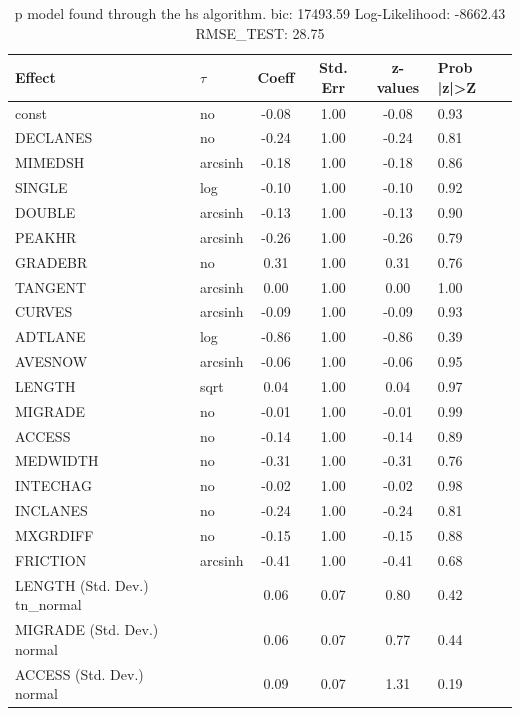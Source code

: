 \begin{table}
	\caption{p model found through the hs algorithm. bic: 17493.59 Log-Likelihood: -8662.43 RMSE_TEST: 28.75}
	\begin{center}
		\begin{tabular}{|l|l|c|c|c|l|}
			\hline
			Effect & $\tau$ & Coeff & Std. Err & z-values & Prob |z|>Z \\
			\hline
			const & no & -0.08 & 1.00 & -0.08 & 0.93 \\
			\hline
			DECLANES & no & -0.24 & 1.00 & -0.24 & 0.81 \\
			\hline
			MIMEDSH & arcsinh & -0.18 & 1.00 & -0.18 & 0.86 \\
			\hline
			SINGLE & log & -0.10 & 1.00 & -0.10 & 0.92 \\
			\hline
			DOUBLE & arcsinh & -0.13 & 1.00 & -0.13 & 0.90 \\
			\hline
			PEAKHR & arcsinh & -0.26 & 1.00 & -0.26 & 0.79 \\
			\hline
			GRADEBR & no & 0.31 & 1.00 & 0.31 & 0.76 \\
			\hline
			TANGENT & arcsinh & 0.00 & 1.00 & 0.00 & 1.00 \\
			\hline
			CURVES & arcsinh & -0.09 & 1.00 & -0.09 & 0.93 \\
			\hline
			ADTLANE & log & -0.86 & 1.00 & -0.86 & 0.39 \\
			\hline
			AVESNOW & arcsinh & -0.06 & 1.00 & -0.06 & 0.95 \\
			\hline
			LENGTH & sqrt & 0.04 & 1.00 & 0.04 & 0.97 \\
			\hline
			MIGRADE & no & -0.01 & 1.00 & -0.01 & 0.99 \\
			\hline
			ACCESS & no & -0.14 & 1.00 & -0.14 & 0.89 \\
			\hline
			MEDWIDTH & no & -0.31 & 1.00 & -0.31 & 0.76 \\
			\hline
			INTECHAG & no & -0.02 & 1.00 & -0.02 & 0.98 \\
			\hline
			INCLANES & no & -0.24 & 1.00 & -0.24 & 0.81 \\
			\hline
			MXGRDIFF & no & -0.15 & 1.00 & -0.15 & 0.88 \\
			\hline
			FRICTION & arcsinh & -0.41 & 1.00 & -0.41 & 0.68 \\
			\hline
			LENGTH (Std. Dev.) tn_normal &  & 0.06 & 0.07 & 0.80 & 0.42 \\
			\hline
			MIGRADE (Std. Dev.) normal &  & 0.06 & 0.07 & 0.77 & 0.44 \\
			\hline
			ACCESS (Std. Dev.) normal &  & 0.09 & 0.07 & 1.31 & 0.19 \\

\end{tabular}
\end{center}
\end{table}
